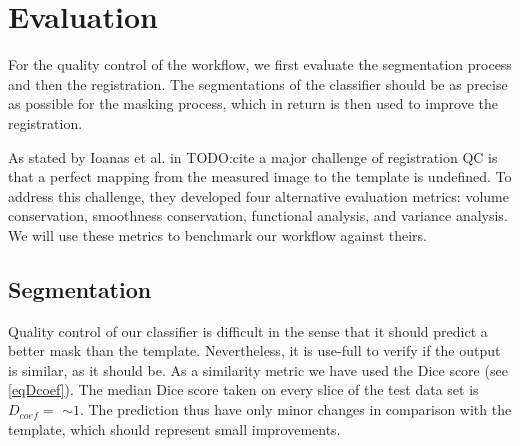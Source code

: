 \section{Evaluation}
For the quality control of the workflow, we first evaluate the segmentation process and then the registration.
The segmentations of the classifier should be as precise as possible for the masking process, which in return is then used to improve the registration.

As stated by Ioanas et al. in TODO:cite a major challenge of registration QC is that a perfect mapping from the measured image to the template is undefined.
To address this challenge, they developed four alternative evaluation metrics: volume conservation, smoothness conservation, functional analysis, and variance analysis.
We will use these metrics to benchmark our workflow against theirs.

\subsection{Segmentation}
Quality control of our classifier is difficult in the sense that it should predict a better mask than the template.
Nevertheless, it is use-full to verify if the output is similar, as it should be.
As a similarity metric we have used the Dice score (see \cref{eqDcoef}).
The median Dice score taken on every slice of the test data set is $D_{coef}= $  $\sim 1$.
The prediction thus have only minor changes in comparison with the template, which should represent small improvements.

